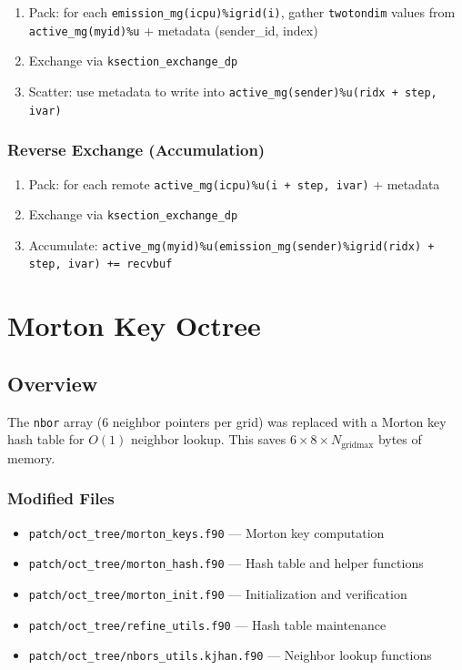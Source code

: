 \documentclass[11pt,fleqn]{book}
\begin{document}
\begin{enumerate}
  \item Pack: for each \texttt{emission\_mg(icpu)\%igrid(i)}, gather \texttt{twotondim} values from \texttt{active\_mg(myid)\%u} + metadata (sender\_id, index)
  \item Exchange via \texttt{ksection\_exchange\_dp}
  \item Scatter: use metadata to write into \texttt{active\_mg(sender)\%u(ridx + step, ivar)}
\end{enumerate}

\subsection{Reverse Exchange (Accumulation)}

\begin{enumerate}
  \item Pack: for each remote \texttt{active\_mg(icpu)\%u(i + step, ivar)} + metadata
  \item Exchange via \texttt{ksection\_exchange\_dp}
  \item Accumulate: \texttt{active\_mg(myid)\%u(emission\_mg(sender)\%igrid(ridx) + step, ivar) += recvbuf}
\end{enumerate}


\chapter{Morton Key Octree}

\section{Overview}

The \texttt{nbor} array (6 neighbor pointers per grid) was replaced with a Morton key hash table for $O(1)$ neighbor lookup. This saves $6 \times 8 \times N_{\text{gridmax}}$ bytes of memory.

\subsection{Modified Files}

\begin{itemize}[leftmargin=2em]
  \item \texttt{patch/oct\_tree/morton\_keys.f90} --- Morton key computation
  \item \texttt{patch/oct\_tree/morton\_hash.f90} --- Hash table and helper functions
  \item \texttt{patch/oct\_tree/morton\_init.f90} --- Initialization and verification
  \item \texttt{patch/oct\_tree/refine\_utils.f90} --- Hash table maintenance
  \item \texttt{patch/oct\_tree/nbors\_utils.kjhan.f90} --- Neighbor lookup functions
\end{itemize}
\end{document}
